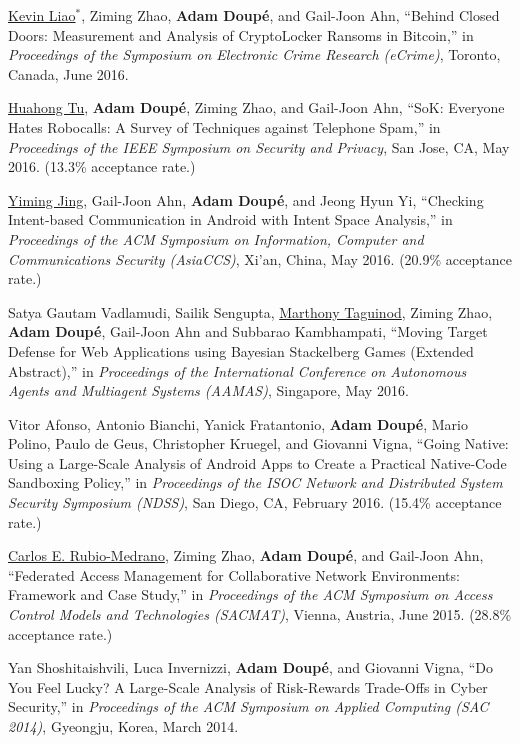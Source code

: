 \documentclass[11pt,letterpaper,sans]{moderncv}
\begin{document}
\begin{etaremune}
\item \underline{Kevin Liao}$^*$, Ziming Zhao, \textbf{Adam Doup\'e},
  and Gail-Joon Ahn, ``Behind Closed Doors: Measurement and Analysis
  of CryptoLocker Ransoms in Bitcoin,'' in \emph{Proceedings of the
    Symposium on Electronic Crime Research (eCrime)}, Toronto, Canada,
  June 2016.

\item \underline{Huahong Tu}, \textbf{Adam Doup\'e}, Ziming Zhao, and
  Gail-Joon Ahn, ``SoK: Everyone Hates Robocalls: A Survey of
  Techniques against Telephone Spam,'' in \emph{Proceedings of the
    IEEE Symposium on Security and Privacy}, San Jose, CA, May 2016.
  (13.3\% acceptance rate.)

\item \underline{Yiming Jing}, Gail-Joon Ahn, \textbf{Adam Doup\'e},
  and Jeong Hyun Yi, ``Checking Intent-based Communication in Android
  with Intent Space Analysis,'' in \emph{Proceedings of the ACM
    Symposium on Information, Computer and Communications Security
  (AsiaCCS)}, Xi’an, China, May 2016. (20.9\% acceptance
  rate.)

\item Satya Gautam Vadlamudi, Sailik Sengupta, \underline{Marthony
  Taguinod}, Ziming Zhao, \textbf{Adam Doup\'e}, Gail-Joon Ahn and
  Subbarao Kambhampati, ``Moving Target Defense for Web Applications
  using Bayesian Stackelberg Games (Extended Abstract),'' in
  \emph{Proceedings of the International Conference on Autonomous
    Agents and Multiagent Systems (AAMAS)}, Singapore, May 2016.

\item Vitor Afonso, Antonio Bianchi, Yanick Fratantonio, \textbf{Adam
  Doup\'e}, Mario Polino, Paulo de Geus, Christopher Kruegel, and
  Giovanni Vigna, ``Going Native: Using a Large-Scale Analysis of
  Android Apps to Create a Practical Native-Code Sandboxing Policy,''
  in \emph{Proceedings of the ISOC Network and Distributed System
    Security Symposium (NDSS)}, San Diego, CA, February 2016. (15.4\%
  acceptance rate.)

\item \underline{Carlos E. Rubio-Medrano}, Ziming Zhao, \textbf{Adam
  Doup\'e}, and Gail-Joon Ahn, ``Federated Access Management for
  Collaborative Network Environments: Framework and Case Study,'' in
  \emph{Proceedings of the ACM Symposium on Access Control Models and
    Technologies (SACMAT)}, Vienna, Austria, June 2015. (28.8\%
  acceptance rate.)

\item Yan Shoshitaishvili, Luca Invernizzi, \textbf{Adam Doup\'e}, and
  Giovanni Vigna, ``Do You Feel Lucky? A Large-Scale Analysis of
  Risk-Rewards Trade-Offs in Cyber Security,'' in \emph{Proceedings of
    the ACM Symposium on Applied Computing (SAC 2014)}, Gyeongju,
  Korea, March 2014.


\end{etaremune}
\end{document}
